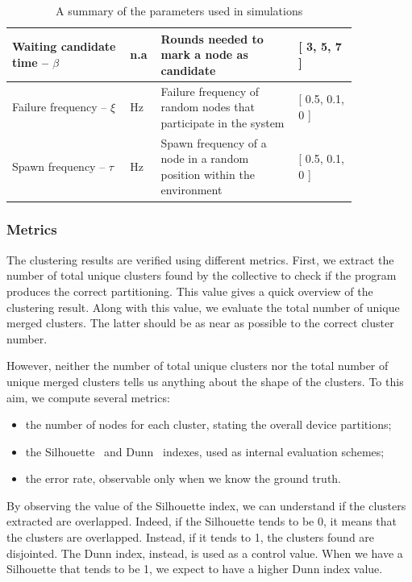 \begin{table}[t]
{\begin{tabular}{|p{0.30\linewidth}|p{0.05\linewidth}|p{0.35\linewidth}|p{0.15\linewidth}|}
      Waiting candidate time -- $\beta$  &  n.a                                             & Rounds needed to mark a node as candidate                                                                                       & {[} 3, 5, 7 {]}       \\ \hline
      Failure frequency      -- $\xi$    &  \unit{\hertz}                                   & Failure frequency of random nodes that participate in the system                                                                                       & {[} 0.5, 0.1, 0 {]}    \\ \hline
      Spawn frequency        -- $\tau$   &  \unit{\hertz}                                   & Spawn frequency of a node in a random position within the environment                                                                           & {[} 0.5, 0.1, 0 {]}    \\ \hline
    \end{tabular}
  }
  \caption{A summary of the parameters used in simulations}
  \label{table:parameters}
\end{table}

\subsubsection{Metrics}

The clustering results are verified using different metrics. First,
 we extract the number of total unique clusters found by the collective
 to check if the program produces the correct partitioning.
%
This value gives a quick overview of the clustering result. Along with this value, we
 evaluate the total number of unique merged clusters.
 The latter should be as near as possible to the correct cluster number.

However, neither the number of total unique clusters nor the total number of unique merged clusters
 tells us anything about the shape of the clusters.
 To this aim, we compute several metrics:
 \begin{itemize}
   \item the number of nodes for each cluster, stating the overall device partitions;
   \item the Silhouette~\cite{ROUSSEEUW198753} and Dunn~\cite{dunn1974well} indexes, used as internal
    evaluation schemes;
  \item the error rate, observable only when we know the ground truth.
 \end{itemize}
By observing the value of the Silhouette index, we can understand if the clusters extracted are overlapped.
 Indeed, if the Silhouette tends to be 0, it means that the clusters are overlapped.
 Instead, if it tends to 1, the clusters found are disjointed.
 The Dunn index, instead, is used as a control value.
 When we have a Silhouette that tends to be 1, we expect to have a higher Dunn index value.

